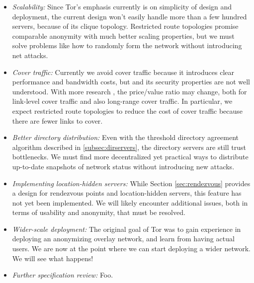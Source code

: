 \documentclass[times,10pt,twocolumn]{article}
\begin{document}
\begin{itemize}
\item \emph{Scalability:} Since Tor's emphasis currently is on simplicity
of design and deployment, the current design won't easily handle more
than a few hundred servers, because of its clique topology. Restricted
route topologies \cite{danezis-pets03} promise comparable anonymity
with much better scaling properties, but we must solve problems like
how to randomly form the network without introducing net attacks.
\item \emph{Cover traffic:} Currently we avoid cover traffic because
it introduces clear performance and bandwidth costs, but and its
security properties are not well understood. With more research
\cite{SS03,defensive-dropping}, the price/value ratio may change, both for
link-level cover traffic and also long-range cover traffic. In particular,
we expect restricted route topologies to reduce the cost of cover traffic
because there are fewer links to cover.
\item \emph{Better directory distribution:} Even with the threshold
directory agreement algorithm described in \ref{subsec:dirservers},
the directory servers are still trust bottlenecks. We must find more
decentralized yet practical ways to distribute up-to-date snapshots of
network status without introducing new attacks.
\item \emph{Implementing location-hidden servers:} While Section
\ref{sec:rendezvous} provides a design for rendezvous points and
location-hidden servers, this feature has not yet been implemented.
We will likely encounter additional issues, both in terms of usability
and anonymity, that must be resolved.
\item \emph{Wider-scale deployment:} The original goal of Tor was to
gain experience in deploying an anonymizing overlay network, and learn
from having actual users. We are now at the point where we can start
deploying a wider network. We will see what happens!
\item \emph{Further specification review:} Foo.
\end{itemize}






\end{document}
